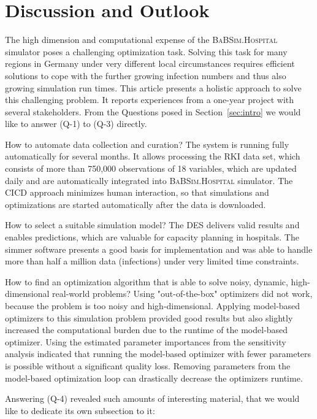 \documentclass[conference]{IEEEtran}
\newcommand{\babsimhospital}{\textsc{BaBSim.Hospital}\xspace}
\begin{document}
\section{Discussion and Outlook}\label{sec:discussion}
The high dimension and computational expense of the \babsimhospital simulator 
poses a challenging optimization task. 
Solving this task for many regions in Germany under very different local circumstances requires 
efficient solutions to cope with the further growing infection numbers and thus also growing simulation run times. 
This article presents a holistic approach to solve this challenging problem. 
It reports experiences from a one-year project with several stakeholders. 
From the Questions posed in Section~\ref{sec:intro} we would like to answer (Q-1) to (Q-3) directly.
\begin{compactenum}[(Q-1)]
\item How to automate data collection and curation?
The system is running fully automatically for several months.
It allows processing  the \gls{RKI} data set, which consists of more than 
750,000 observations of 18 variables, which are updated daily and are automatically integrated into \babsimhospital simulator. 
The \gls{CICD} approach minimizes human interaction, so that simulations and optimizations are
started automatically after the data is downloaded.
\item How to select a suitable simulation model?
The \gls{DES} delivers valid results and enables predictions, which are valuable for capacity planning in hospitals.
The \gls{simmer} software presents a good basis for implementation and was able to handle more than half a million data (infections) under very limited time constraints. 
\item How to find an optimization algorithm that is able to solve noisy, dynamic, high-dimensional real-world problems?
Using "out-of-the-box" optimizers did not work, because the problem is too noisy and high-dimensional.
Applying model-based optimizers to this simulation problem provided good results but also slightly increased the computational burden due to the runtime of the model-based optimizer. 
Using the estimated parameter importances from the sensitivity analysis indicated that running the model-based optimizer with fewer parameters is possible without a significant quality loss. 
Removing parameters from the model-based optimization loop can drastically decrease the optimizers runtime. 
\end{compactenum}
Answering (Q-4) revealed such amounts of interesting material, that we would like to dedicate its own subsection to it:
\end{document}
